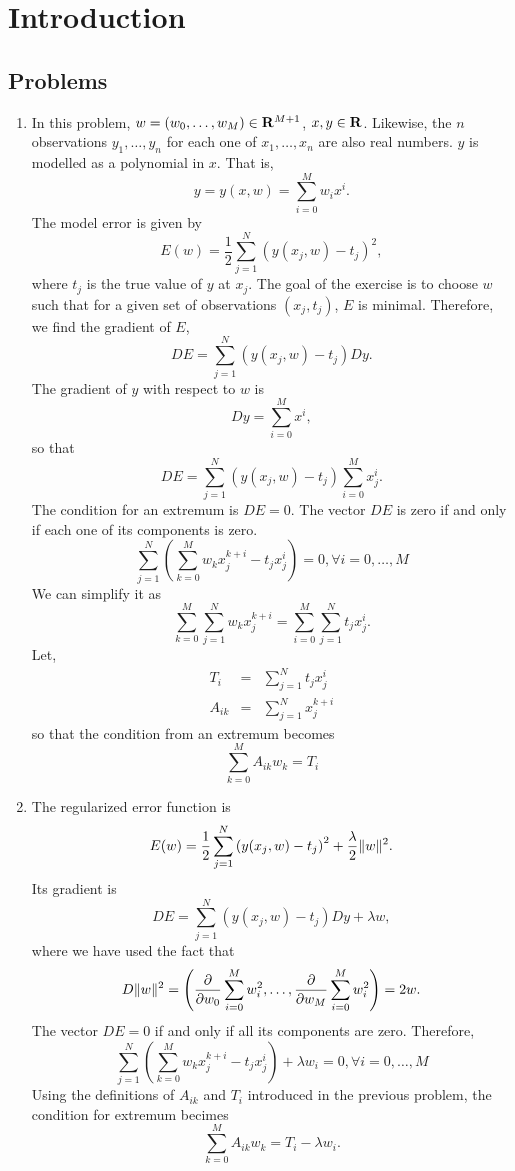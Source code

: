 \chapter{Introduction}\label{c1}
\section{Problems}
\begin{enumerate}
\item In this problem, $w = (w_0, \ldots, w_M) \in \mathbf{R}^{M+1}$, $x, y \in \mathbf{R}$. Likewise, the $n$
observations $y_1, \ldots, y_n$ for each one of $x_1, \ldots, x_n$ are also real numbers. $y$
is modelled as a polynomial in $x$. That is,
\begin{equation}\label{c1pe1}
y = y(x, w) = \sum_{i=0}^Mw_ix^i.
\end{equation}
The model error is given by
\begin{equation}\label{c1pe2}
E(w) = \frac{1}{2}\sum_{j=1}^N \left(y(x_j, w) - t_j\right)^2,
\end{equation}
where $t_j$ is the true value of $y$ at $x_j$. The goal of the exercise is to choose $w$ such 
that for a given set of observations $(x_j, t_j)$, $E$ is minimal. Therefore, we find the
gradient of $E$,
\[
DE = \sum_{j=1}^N\left(y(x_j, w) - t_j\right)Dy.
\]
The gradient of $y$ with respect to $w$ is
\[
Dy = \sum_{i=0}^M x^i,
\]
so that
\[
DE = \sum_{j=1}^N\left(y(x_j, w) - t_j\right)\sum_{i=0}^M x_j^i.
\]
The condition for an extremum is $DE = 0$. The vector $DE$ is zero if and only if each one
of its components is zero.
\[
\sum_{j=1}^N\left(\sum_{k=0}^M w_k x_j^{k+i} - t_jx_j^i\right) = 0, \forall i = 0, \ldots, M
\]
We can simplify it as
\[
\sum_{k=0}^M \sum_{j=1}^N w_k x_j^{k+i} = \sum_{i=0}^M\sum_{j=1}^N t_jx_j^i.
\]
Let,
\begin{eqnarray*}
T_i &=& \sum_{j=1}^N t_jx_j^i \\
A_{ik} &=& \sum_{j=1}^N x_j^{k+i}
\end{eqnarray*}
so that the condition from an extremum becomes
\[
\sum_{k=0}^M A_{ik}w_k = T_i
\]

\item The regularized error function is
\begin{equation}\label{c1pe3}
E(w) = \frac{1}{2}\sum_{j=1}^N \left(y(x_j, w) - t_j\right)^2 + \frac{\lambda}{2}\lVert w\rVert^2.
\end{equation}
Its gradient is
\[
DE = \sum_{j=1}^N\left(y(x_j, w) - t_j\right)Dy + \lambda w,
\]
where we have used the fact that 
\[
D\lVert w\rVert^2 = \left(\frac{\partial}{\partial w_0}\sum_{i=0}^M w_i^2, \ldots, \frac{\partial}{\partial w_M}\sum_{i=0}^M w_i^2\right) = 2w.
\]
The vector $DE = 0$ if and only if all its components are zero. Therefore,
\[
\sum_{j=1}^N\left(\sum_{k=0}^M w_k x_j^{k+i} - t_jx_j^i\right) + \lambda w_i = 0, \forall i = 0, \ldots, M
\]
Using the definitions of $A_{ik}$ and $T_i$ introduced in the previous problem, the condition
for extremum becimes
\[
\sum_{k=0}^M A_{ik}w_k = T_i - \lambda w_i.
\]


\end{enumerate}

